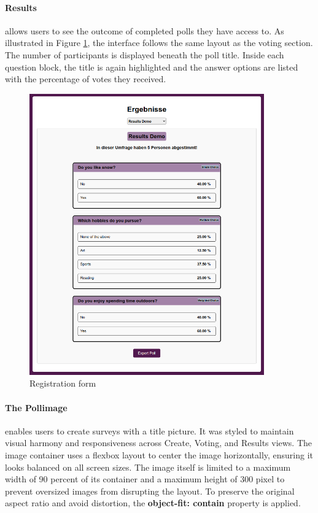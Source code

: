 \documentclass[a4paper,12pt]{report}
\begin{document}
\paragraph{Results} allows users to see the outcome of completed polls they have access to. As illustrated in Figure \ref{fig:results_view}, the interface follows the same layout as the voting section. The number of participants is displayed beneath the poll title. Inside each question block, the title is again highlighted and the answer options are listed with the percentage of votes they received.
\begin{figure}[H]
	\centering
	\includegraphics[width=0.9\textwidth]{pics/results_view.png}
	\caption{Registration form}
	\label{fig:results_view}
\end{figure}
\paragraph{The Pollimage} enables users to create surveys with a title picture. It was styled to maintain visual harmony and responsiveness across Create, Voting, and Results views. The image container uses a flexbox layout to center the image horizontally, ensuring it looks balanced on all screen sizes. The image itself is limited to a maximum width of 90 percent of its container and a maximum height of 300 pixel to prevent oversized images from disrupting the layout. To preserve the original aspect ratio and avoid distortion, the \textbf{object-fit: contain} property is applied.\parencite{cssobjectfit}
\end{document}
